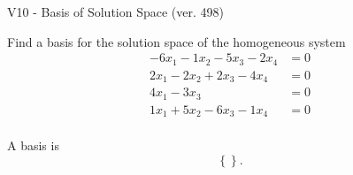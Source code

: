 \begin{exercise}
  \begin{exerciseTitle}V10 - Basis of Solution Space (ver. 498)\end{exerciseTitle}
  \begin{exerciseStatement}
    Find a basis for the solution space of the homogeneous system 
\begin{align*}
 -6 x_ 1 -1 x_ 2 -5 x_ 3 -2 x_ 4 &= 0  \\ 
  2 x_ 1 -2 x_ 2 + 2 x_ 3 -4 x_ 4 &= 0  \\ 
  4 x_ 1 -3 x_ 3 &= 0  \\ 
  1 x_ 1 + 5 x_ 2 -6 x_ 3 -1 x_ 4 &= 0  \\ 
 \end{align*}


 
  \end{exerciseStatement}

  \begin{exerciseAnswer}
   A basis is   
\[\left\{\right\}.\]

  


  \end{exerciseAnswer}
\end{exercise}